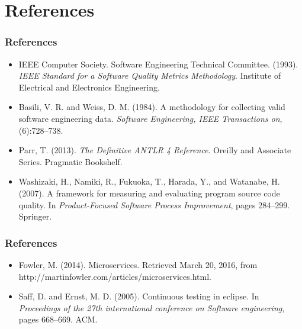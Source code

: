 \section{References}
\begin{frame}
\frametitle{References}
\begin{itemize}
  \item IEEE Computer Society. Software Engineering Technical Committee. (1993). \textit{IEEE Standard for a Software Quality Metrics Methodology}. Institute of Electrical and Electronics Engineering.
  \item Basili, V. R. and Weiss, D. M. (1984). A methodology for collecting valid software engineering data. \textit{Software Engineering, IEEE Transactions on}, (6):728–738.
  \item Parr, T. (2013). \textit{The Definitive ANTLR 4 Reference}. Oreilly and Associate Series. Pragmatic Bookshelf.
  \item Washizaki, H., Namiki, R., Fukuoka, T., Harada, Y., and Watanabe, H. (2007). A framework for measuring and evaluating program source code quality. In \textit{Product-Focused Software Process Improvement}, pages 284–299. Springer.
\end{itemize}
\end{frame}

\begin{frame}
\frametitle{References}
\begin{itemize}
  \item Fowler, M. (2014). Microservices. Retrieved March 20, 2016, from http://martinfowler.com/articles/microservices.html.
  \item Saff, D. and Ernst, M. D. (2005). Continuous testing in eclipse. In \textit{Proceedings of the 27th international conference on Software engineering}, pages 668–669. ACM.
\end{itemize}

\end{frame}

